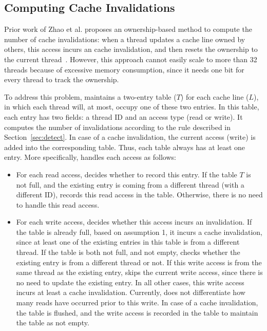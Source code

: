 \subsection{Computing Cache Invalidations}
\label{sec:computeinvalidations}

Prior work of Zhao et al. proposes an ownership-based method to compute the number of cache invalidations: when a thread updates a cache line owned by others, this access incurs an cache invalidation, and then resets the ownership to the current thread~\cite{qinzhao}. However, this approach cannot easily scale to more than 32 threads because of excessive memory consumption, since it needs one bit for every thread to track the ownership.  

To address this problem, \Cheetah{} maintains a two-entry table ($T$) for each cache line ($L$), in which each thread will, at most, occupy one of these two entries. In this table, each entry has two fields: a thread ID and an access type (read or write). It computes the number of invalidations according to the rule described in Section~\ref{sec:detect}. In case of a cache invalidation, the current access (write) is added into the corresponding table. Thus, each table always has at least one entry. More specifically, \cheetah{} handles each access as follows:

\begin{itemize}
\item
For each read access, \cheetah{} decides whether to record this entry. If the table $T$ is not full, and the existing entry is coming from a different thread (with a different ID), \cheetah{} records this read access in the table. Otherwise, there is no need to handle this read access. 
  
\item
For each write access, \cheetah{} decides whether this access incurs an invalidation. If the table is already full, based on assumption 1, it incurs a cache invalidation, since at least one of the existing entries in this table is from a different thread. If the table is both not full, and not empty, \cheetah{} checks whether the existing entry is from a different thread or not. If this write access is from the same thread as the existing entry, \cheetah{} skips the current write access, since there is no need to update the existing entry. In all other cases, this write access incurs at least a cache invalidation. Currently, \cheetah{} does not differentiate how many reads have occurred prior to this write. In case of a cache invalidation, the table is flushed, and the write access is recorded in the table to maintain the table as not empty. 
  
\end{itemize}
     
